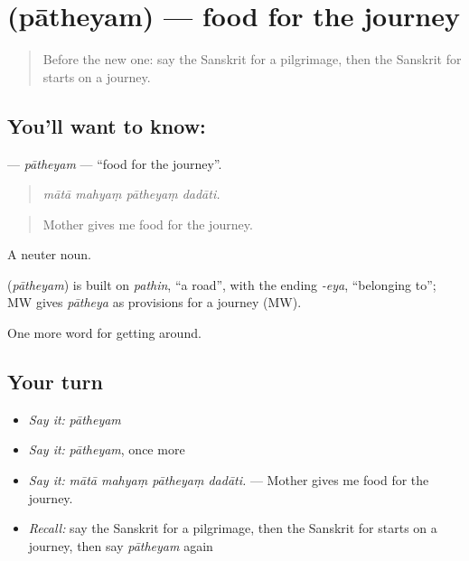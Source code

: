 \section[\texorpdfstring{\sk{पाथेयम्} (pātheyam)}{पाथेयम् (pātheyam)}]{ (pātheyam) — food for the journey}

\label{lesson:SA-C394-patheyam}



\begin{quote}
Before the new one: say the Sanskrit for a pilgrimage, then the Sanskrit for starts on a journey.
\end{quote}

\subsection*{You'll want to know: }
\textbf{} — \emph{pātheyam} — \textquotedblleft{}food for the journey\textquotedblright{}.

\begin{quote}
   
\end{quote}

\begin{quote}
\emph{mātā mahyaṃ pātheyaṃ dadāti.}
\end{quote}

\begin{quote}
Mother gives me food for the journey.
\end{quote}

A neuter noun.

\begin{cousinweb}
\textbf{} (\emph{pātheyam}) is built on \emph{pathin}, \textquotedblleft{}a road\textquotedblright{}, with the ending \emph{-eya}, \textquotedblleft{}belonging to\textquotedblright{}; MW gives \emph{pātheya} as provisions for a journey (MW).
\end{cousinweb}

\begin{grammarlens}[title={What you've built}]
One more word for getting around.
\end{grammarlens}

\subsection*{Your turn}
\begin{itemize}
\raggedright
  \item \emph{Say it:} \emph{pātheyam}
  \item \emph{Say it:} \emph{pātheyam}, once more
  \item \emph{Say it:} \emph{mātā mahyaṃ pātheyaṃ dadāti.} — Mother gives me food for the journey.
  \item \emph{Recall:} say the Sanskrit for a pilgrimage, then the Sanskrit for starts on a journey, then say \emph{pātheyam} again
\end{itemize}

